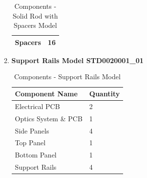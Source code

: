 \documentclass[../../main.tex]{subfiles}
\begin{document}
\begin{enumerate}
\begin{enumerate}
\begin{table}[h!]
\begin{tabular}{| p{5cm} | p{3cm} |}
             \hline
             Spacers & 16 \\
             \hline
        \end{tabular}
        \caption{Components - Solid Rod with Spacers Model}
        \label{tab:my_label}
    \end{table}
    \item \textbf{Support Rails Model STD0020001\_01}
    \begin{table}[h!]
        \centering
        \begin{tabular}{| p{5cm} | p{3cm} |}
             \hline
             \textbf{Component Name} & \textbf{Quantity}  \\
             \hline
             Electrical PCB & 2 \\
             \hline
             Optics System \& PCB & 1\\
             \hline
             Side Panels & 4 \\
             \hline
             Top Panel & 1 \\
             \hline
             Bottom Panel & 1 \\
             \hline
             Support Rails & 4 \\
             \hline
        \end{tabular}
        \caption{Components - Support Rails Model}
        \label{tab:my_label}
    \end{table}
        \end{enumerate}
    

\end{enumerate}
\end{document}
